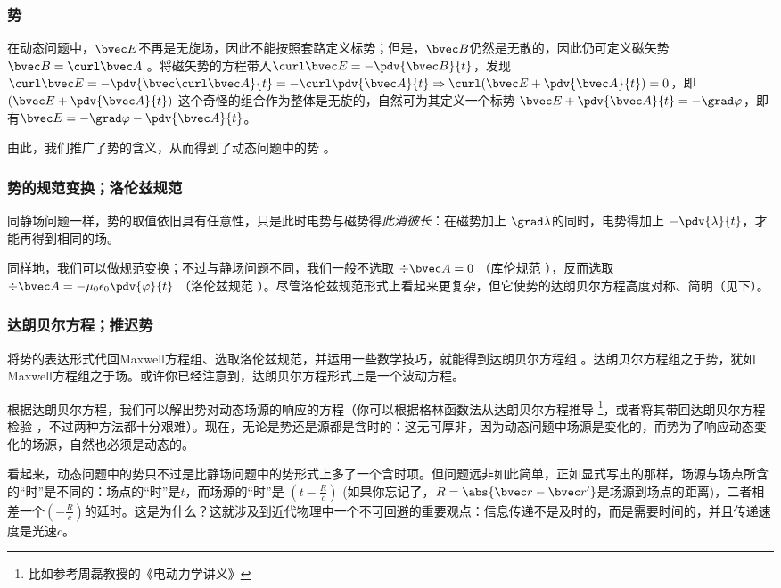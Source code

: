 \subsubsection{势}
在动态问题中，$\bvec E$不再是无旋场，因此不能按照套路定义标势；但是，$\bvec B$仍然是无散的，因此仍可定义磁矢势 $\bvec B = \curl \bvec A~$。将磁矢势的方程带入$ \curl \bvec E = -\pdv{\bvec B}{t}$，发现$ \curl \bvec E = -\pdv{\bvec \curl \bvec A}{t} = - \curl \pdv{\bvec A}{t} \Rightarrow \curl(\bvec E + \pdv{\bvec A}{t}) = 0$，即 $(\bvec E + \pdv{\bvec A}{t})$ 这个奇怪的组合作为整体是无旋的，自然可为其定义一个标势 $\bvec E + \pdv{\bvec A}{t} = -\grad \varphi$，即有$\bvec E  = -\grad \varphi - \pdv{\bvec A}{t} $。

由此，我们推广了势的含义，从而得到了动态问题中的势 。

\subsubsection{势的规范变换；洛伦兹规范}
同静场问题一样，势的取值依旧具有任意性，只是此时电势与磁势得\textsl{此消彼长}：在磁势加上 $\grad \lambda$的同时，电势得加上 $ - \pdv{\lambda}{t}$，才能再得到相同的场。

同样地，我们可以做规范变换；不过与静场问题不同，我们一般不选取 $\div \bvec A =0$ （库伦规范 ），反而选取$\div \bvec A = -\mu_0 \epsilon_0 \pdv{\varphi}{t}~$（洛伦兹规范 ）。尽管洛伦兹规范形式上看起来更复杂，但它使势的达朗贝尔方程高度对称、简明（见下）。

\subsubsection{达朗贝尔方程；推迟势}
将势的表达形式代回Maxwell方程组、选取洛伦兹规范，并运用一些数学技巧，就能得到达朗贝尔方程组 。达朗贝尔方程组之于势，犹如Maxwell方程组之于场。或许你已经注意到，达朗贝尔方程形式上是一个波动方程。

根据达朗贝尔方程，我们可以解出势对动态场源的响应的方程（你可以根据格林函数法从达朗贝尔方程推导 \footnote{比如参考周磊教授的《电动力学讲义》}，或者将其带回达朗贝尔方程检验 \cite{GriffE}，不过两种方法都十分艰难）。现在，无论是势还是源都是含时的：这无可厚非，因为动态问题中场源是变化的，而势为了响应动态变化的场源，自然也必须是动态的。

看起来，动态问题中的势只不过是比静场问题中的势形式上多了一个含时项。但问题远非如此简单，正如显式写出的那样，场源与场点所含的“时”是不同的：场点的“时”是$t$，而场源的“时”是 $(t-\frac{R}{c})$ (如果你忘记了，$R = \abs{\bvec r-\bvec r'}$是场源到场点的距离)，二者相差一个$(-\frac{R}{c})$的延时。这是为什么？这就涉及到近代物理中一个不可回避的重要观点：信息传递不是及时的，而是需要时间的，并且传递速度是光速$c$。

